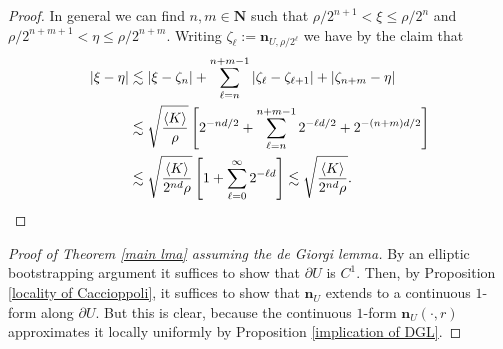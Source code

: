 \documentclass[reqno,10pt]{amsart}
\newcommand{\NN}{\mathbf{N}}
\newcommand{\normal}{\mathbf n}
\def\Japan#1{\left \langle #1 \right \rangle}
\theoremstyle{definition}
\numberwithin{equation}{section}
\begin{document}
\begin{proof}
In general we can find $n, m \in \NN$ such that $\rho/2^{n + 1} < \xi \leq \rho/2^n$ and $\rho/2^{n + m + 1} < \eta \leq \rho/2^{n + m}$.
Writing $\zeta_\ell := \normal_{U, \rho/2^\ell}$ we have by the claim that
\begin{align*}
|\xi - \eta| &\lesssim |\xi - \zeta_n| + \sum_{\ell=n}^{n + m - 1} |\zeta_\ell - \zeta_{\ell + 1}| + |\zeta_{n + m} - \eta| \\
&\lesssim \sqrt{\frac{\Japan K}{\rho}} \left[2^{-nd/2} + \sum_{\ell=n}^{n + m - 1} 2^{-\ell d/2} + 2^{-(n + m) d/2} \right]\\
&\lesssim \sqrt{\frac{\Japan{K}}{2^{nd} \rho}} \left[1 + \sum_{\ell=0}^\infty 2^{-\ell d}\right] \lesssim \sqrt{\frac{\Japan{K}}{2^{nd} \rho}}. \qedhere
\end{align*}
\end{proof}

\begin{proof}[Proof of Theorem \ref{main lma} assuming the de Giorgi lemma]
By an elliptic bootstrapping argument it suffices to show that $\partial U$ is $C^1$.
Then, by Proposition \ref{locality of Caccioppoli}, it suffices to show that $\normal_U$ extends to a continuous $1$-form along $\partial U$.
But this is clear, because the continuous $1$-form $\normal_U(\cdot, r)$ approximates it locally uniformly by Proposition \ref{implication of DGL}.
\end{proof}



\end{document}
